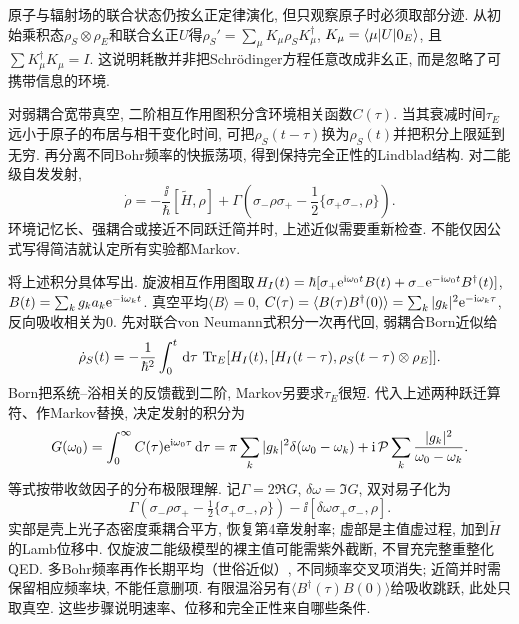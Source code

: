 \label{ch:open}
原子与辐射场的联合状态仍按幺正定律演化, 但只观察原子时必须取部分迹. 从初始乘积态$\rho_S\otimes\rho_E$和联合幺正$U$得$\rho_S'=\sum_\mu K_\mu\rho_SK_\mu^\dagger$, $K_\mu=\langle \mu\rvert U\lvert 0_E\rangle$, 且$\sum K_\mu^\dagger K_\mu=I$. 这说明耗散并非把Schrödinger方程任意改成非幺正, 而是忽略了可携带信息的环境.

对弱耦合宽带真空, 二阶相互作用图积分含环境相关函数$C(\tau)$. 当其衰减时间$\tau_E$远小于原子的布居与相干变化时间, 可把$\rho_S(t-\tau)$换为$\rho_S(t)$并把积分上限延到无穷. 再分离不同Bohr频率的快振荡项, 得到保持完全正性的Lindblad结构. 对二能级自发发射,
\begin{equation}\dot\rho=-\frac\ii\hbar[\widetilde H,\rho]+\Gamma\left(\sigma_-\rho\sigma_+-\frac12\{\sigma_+\sigma_-,\rho\}\right).\label{eq:master}\end{equation}
环境记忆长、强耦合或接近不同跃迁简并时, 上述近似需要重新检查. 不能仅因公式写得简洁就认定所有实验都Markov.

将上述积分具体写出. 旋波相互作用图取$H_I(t)=\hbar[\sigma_+\mathrm e^{\mathrm i\omega_0t}B(t)+\sigma_-\mathrm e^{-\mathrm i\omega_0t}B^\dagger(t)]$, $B(t)=\sum_kg_ka_k\mathrm e^{-\mathrm i\omega_kt}$. 真空平均$\langle B\rangle=0$, $C(\tau)=\langle B(\tau)B^\dagger(0)\rangle=\sum_k|g_k|^2\mathrm e^{-\mathrm i\omega_k\tau}$, 反向吸收相关为0. 先对联合von Neumann式积分一次再代回, 弱耦合Born近似给
\[\dot\rho_S(t)=-\frac1{\hbar^2}\int_0^t\,\mathrm d\tau\,
 \operatorname{Tr}_E[H_I(t),[H_I(t-\tau),\rho_S(t-\tau)\otimes\rho_E]].\]
Born把系统--浴相关的反馈截到二阶, Markov另要求$\tau_E$很短. 代入上述两种跃迁算符、作Markov替换, 决定发射的积分为
\[G(\omega_0)=\int_0^\infty C(\tau)\mathrm e^{\mathrm i\omega_0\tau}\,\mathrm d\tau
 =\pi\sum_k|g_k|^2\delta(\omega_0-\omega_k)
 +\mathrm i\,\mathcal P\sum_k\frac{|g_k|^2}{\omega_0-\omega_k}.\]
等式按带收敛因子的分布极限理解. 记$\Gamma=2\Re G$, $\delta\omega=\Im G$, 双对易子化为
\[\Gamma(\sigma_-\rho\sigma_+-\tfrac12\{\sigma_+\sigma_-,\rho\})
 -\ii[\delta\omega\sigma_+\sigma_-,\rho].\]
实部是壳上光子态密度乘耦合平方, 恢复第4章发射率; 虚部是主值虚过程, 加到$\widetilde H$的Lamb位移中. 仅旋波二能级模型的裸主值可能需紫外截断, 不冒充完整重整化QED. 多Bohr频率再作长期平均（世俗近似）, 不同频率交叉项消失; 近简并时需保留相应频率块, 不能任意删项. 有限温浴另有$\langle B^\dagger(\tau)B(0)\rangle$给吸收跳跃, 此处只取真空. 这些步骤说明速率、位移和完全正性来自哪些条件.

